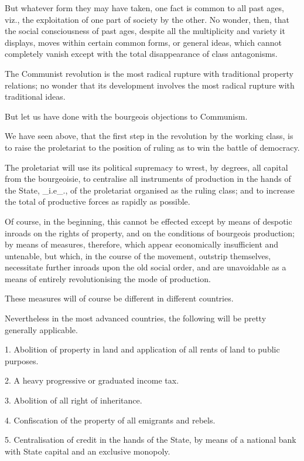 But whatever form they may have taken, one fact is common to all past
ages, viz., the exploitation of one part of society by the other. No
wonder, then, that the social consciousness of past ages, despite all
the multiplicity and variety it displays, moves within certain common
forms, or general ideas, which cannot completely vanish except with the
total disappearance of class antagonisms.

The Communist revolution is the most radical rupture with traditional
property relations; no wonder that its development involves the most
radical rupture with traditional ideas.

But let us have done with the bourgeois objections to Communism.

We have seen above, that the first step in the revolution by the
working class, is to raise the proletariat to the position of ruling as
to win the battle of democracy.

The proletariat will use its political supremacy to wrest, by degrees,
all capital from the bourgeoisie, to centralise all instruments of
production in the hands of the State, _i.e_., of the proletariat
organised as the ruling class; and to increase the total of productive
forces as rapidly as possible.

Of course, in the beginning, this cannot be effected except by means of
despotic inroads on the rights of property, and on the conditions of
bourgeois production; by means of measures, therefore, which appear
economically insufficient and untenable, but which, in the course of
the movement, outstrip themselves, necessitate further inroads upon the
old social order, and are unavoidable as a means of entirely
revolutionising the mode of production.

These measures will of course be different in different countries.

Nevertheless in the most advanced countries, the following will be
pretty generally applicable.

1. Abolition of property in land and application of all rents of land
to public purposes.

2. A heavy progressive or graduated income tax.

3. Abolition of all right of inheritance.

4. Confiscation of the property of all emigrants and rebels.

5. Centralisation of credit in the hands of the State, by means of a
national bank with State capital and an exclusive monopoly.

